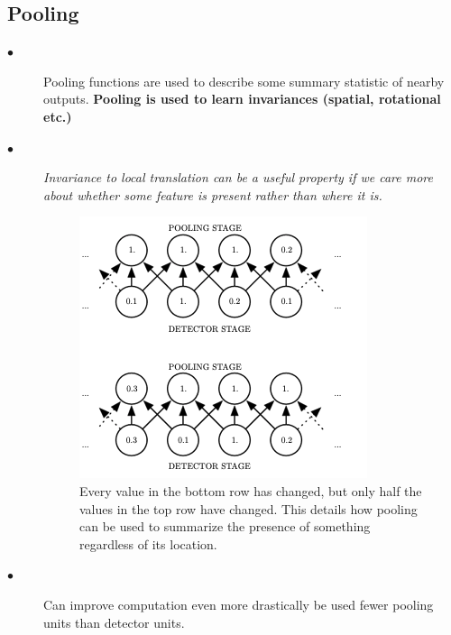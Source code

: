 \documentclass{article}
\begin{document}
    \subsection{Pooling}
    
\begin{description}
    \item[$\bullet$] Pooling functions are used to describe some summary statistic of nearby outputs. \textbf{Pooling is used to learn invariances (spatial, rotational etc.)}
    
    \item[$\bullet$] \textit{Invariance to local translation can be a useful property if we care more about whether some feature is present rather than where it is.}
    
    \begin{figure}[h!]
        \centering
        \includegraphics[width=0.5\linewidth]{Screen Shot 2021-01-18 at 11.33.20 AM.png}
        \caption{Every value in the bottom row has changed, but only half the values in the top row have changed. This details how pooling can be used to summarize the presence of something regardless of its location.}
        \label{fig:my_label}
    \end{figure}
    
    \item[$\bullet$] Can improve computation even more drastically be used fewer pooling units than detector units.
    
\end{description}
\end{document}
